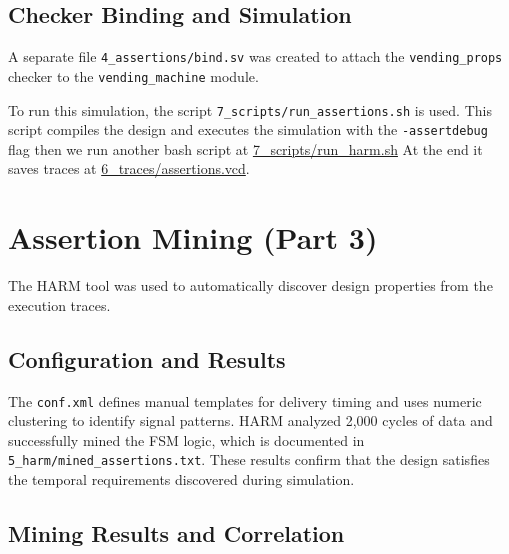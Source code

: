 \documentclass[11pt]{article}
\begin{document}
\subsection{Checker Binding and Simulation}
A separate file \texttt{4\_assertions/bind.sv} was created to attach the \texttt{vending\_props} checker to the \texttt{vending\_machine} module. 

To run this simulation, the script \texttt{7\_scripts/run\_assertions.sh} is used. This script compiles the design and executes the simulation with the \texttt{-assertdebug} flag then we run another bash script at \url{7_scripts/run_harm.sh} At the end it saves traces at \url{6_traces/assertions.vcd}.

\section{Assertion Mining (Part 3)}
The HARM tool was used to automatically discover design properties from the execution traces.

\subsection{Configuration and Results}
The \texttt{conf.xml} defines manual templates for delivery timing and uses numeric clustering to identify signal patterns. HARM analyzed 2,000 cycles of data and successfully mined the FSM logic, which is documented in \texttt{5\_harm/mined\_assertions.txt}. These results confirm that the design satisfies the temporal requirements discovered during simulation.



\subsection{Mining Results and Correlation}
\end{document}
